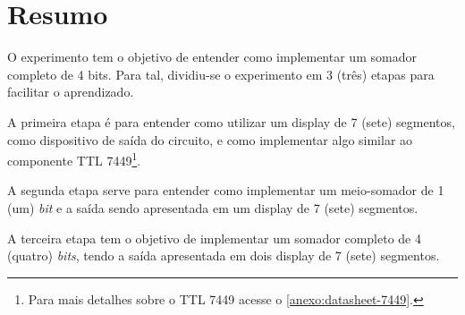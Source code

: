 \chapter{Resumo}

O experimento tem o objetivo de entender como implementar um somador completo de 4 bits. Para tal, dividiu-se
o experimento em 3 (três) etapas para facilitar o aprendizado.

A primeira etapa é para entender como utilizar um display de 7 (sete) segmentos, como dispositivo
de saída do circuito, e como implementar algo similar
ao componente TTL 7449\footnote{Para mais detalhes sobre o TTL 7449 acesse o \autoref{anexo:datasheet-7449}.}.

A segunda etapa serve para entender como implementar um meio-somador de 1 (um) \textit{bit} e a
saída sendo apresentada em um display de 7 (sete) segmentos.

A terceira etapa tem o objetivo de implementar um somador completo de 4 (quatro) \textit{bits}, tendo
 a saída apresentada em dois display de 7 (sete) segmentos.


